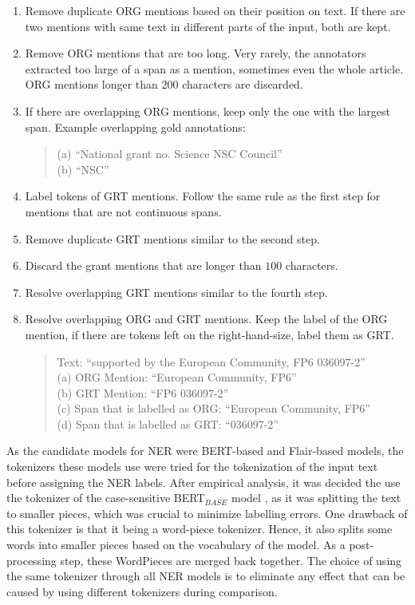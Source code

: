 \documentclass{report}
\theoremstyle{definition}
\theoremstyle{remark}
\begin{document}
\begin{enumerate}
    \item Remove duplicate ORG mentions based on their position on text. If there are two mentions with same text in different parts of the input, both are kept.
    \item Remove ORG mentions that are too long. Very rarely, the annotators extracted too large of a span as a mention, sometimes even the whole article. ORG mentions longer than $200$ characters are discarded.
    \item If there are overlapping ORG mentions, keep only the one with the largest span. Example overlapping gold annotations:
    \begin{quote}
        (a) ``National grant no. Science NSC Council'' \\
        (b) ``NSC''
    \end{quote}
    \item Label tokens of GRT mentions. Follow the same rule as the first step for mentions that are not continuous spans.
    \item Remove duplicate GRT mentions similar to the second step.
    \item Discard the grant mentions that are longer than $100$ characters. 
    \item Resolve overlapping GRT mentions similar to the fourth step.
    \item Resolve overlapping ORG and GRT mentions. Keep the label of the ORG mention, if there are tokens left on the right-hand-size, label them as GRT. 
    \begin{quote}
        Text: ``supported by the European Community, FP6 036097-2'' \\
        (a) ORG Mention: ``European Community, FP6'' \\
        (b) GRT Mention: ``FP6 036097-2'' \\
        (c) Span that is labelled as ORG: ``European Community, FP6'' \\
        (d) Span that is labelled as GRT: ``036097-2''
    \end{quote}
\end{enumerate}
    As the candidate models for NER were BERT-based \cite{BERT} and Flair-based \cite{flairpaper} models, the tokenizers these models use were tried for the tokenization of the input text before assigning the NER labels. After empirical analysis, it was decided the use the tokenizer of the case-sensitive BERT$_{BASE}$ model \cite{BERT}, as it was splitting the text to smaller pieces, which was crucial to minimize labelling errors. One drawback of this tokenizer is that it being a word-piece tokenizer. Hence, it also splits some words into smaller pieces based on the vocabulary of the model. As a post-processing step, these WordPieces are merged back together. The choice of using the same tokenizer through all NER models is to eliminate any effect that can be caused by using different tokenizers during comparison.
\end{document}
